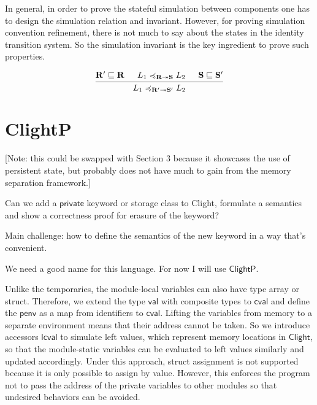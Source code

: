 \documentclass[acmsmall,screen,review,anonymous]{acmart}
\newcommand{\kw}[1]{\ensuremath{ \mathsf{#1} }}
\renewcommand{\preceq}{\preccurlyeq}
\newcommand{\ClightP}{\ensuremath{ \mathsf{ClightP} }}
\newcommand{\Clight}{\ensuremath{ \mathsf{Clight} }}
\begin{document}
In general, in order to prove the stateful simulation between components
one has to design the simulation relation and invariant.
However, for proving simulation convention refinement,
there is not much to say about the states in the identity transition system.
So the simulation invariant is the key ingredient to prove such properties.


\begin{theorem} \label{thm:scseq}
  \[
    \begin{prooftree}
      \hypo{\mathbf{R'} \sqsubseteq \mathbf{R}}
      \hypo{L_1 \preceq_{\mathbf{R} \twoheadrightarrow \mathbf{S}} L_2}
      \hypo{\mathbf{S} \sqsubseteq \mathbf{S'}}
      \infer3{L_1 \preceq_{\mathbf{R'} \twoheadrightarrow \mathbf{S'}} L_2}
    \end{prooftree}
  \]
\end{theorem}

\section{ClightP}
\label{sec:clightp-1}


{
\color{gray}
[Note: this could be swapped with Section 3
because it showcases the use of persistent state,
but probably does not have much to gain
from the memory separation framework.]

Can we add a $\mathsf{private}$ keyword or storage class to Clight,
formulate a semantics and show a correctness proof
for erasure of the keyword?

Main challenge: how to define the semantics of the new keyword
in a way that's convenient.

We need a good name for this language.
For now I will use \ClightP{}.
}

Unlike the temporaries,
the module-local variables can also have type array or struct.
Therefore, we extend the type $\kw{val}$ with composite types to $\kw{cval}$
and define the $\kw{penv}$ as a map from identifiers to $\kw{cval}$.
Lifting the variables from memory to a separate environment
means that their address cannot be taken.
So we introduce accessors $\kw{lcval}$ to simulate left values,
which represent memory locations in $\Clight$,
so that the module-static variables can be evaluated to left values similarly
and updated accordingly.
Under this approach, struct assignment is not supported
because it is only possible to assign by value.
However, this enforces the program not to pass the address
of the private variables to other modules
so that undesired behaviors can be avoided.
\end{document}
